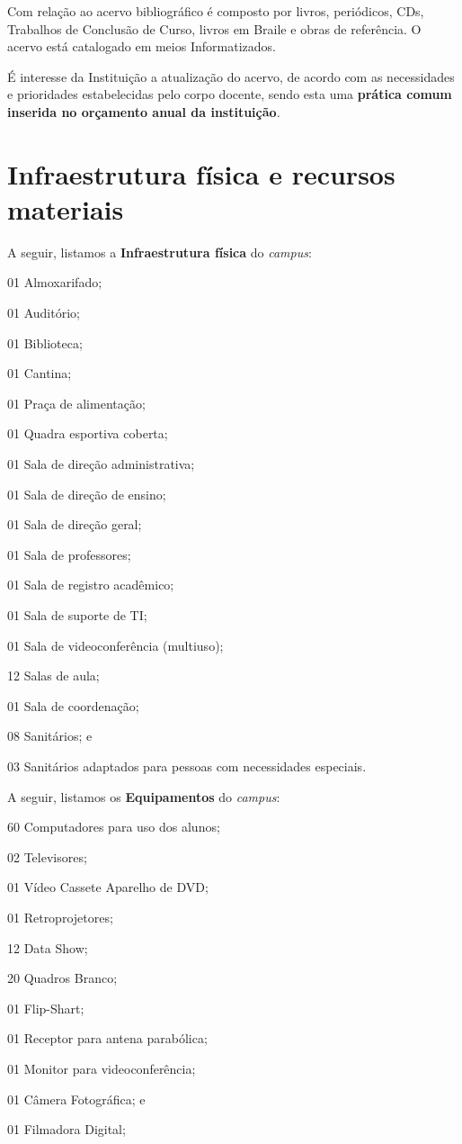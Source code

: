 \documentclass[
	12pt,				%
	openright,			%
	twoside,			%
	a4paper,			%
	chapter=TITLE,		%
	english,			%
	french,				%
	spanish,			%
	brazil,				%
	]{abntex2}
\begin{document}
Com relação ao acervo bibliográfico é composto por livros, periódicos, CDs, Trabalhos de Conclusão de Curso, livros em Braile e  obras de referência. O acervo está catalogado em meios Informatizados.

É interesse da Instituição a atualização do acervo, de acordo com as necessidades e prioridades estabelecidas pelo corpo docente, sendo esta uma \textbf{prática comum inserida no orçamento anual da instituição}.


\section{Infraestrutura física e recursos materiais}

A seguir, listamos a \textbf{Infraestrutura física} do \textit{campus}:

\begin{alineas}
	\item 01 Almoxarifado;
	\item 01 Auditório;
	\item 01 Biblioteca;
	\item 01 Cantina;
	\item 01  Praça de alimentação;
	\item 01 Quadra esportiva coberta;
	\item 01 Sala de direção administrativa;
	\item 01 Sala de direção de ensino;
	\item 01 Sala de direção geral;
	\item 01 Sala de professores;
	\item 01 Sala de registro acadêmico;
	\item 01 Sala de suporte de TI;
	\item 01 Sala de videoconferência (multiuso);
	\item 12 Salas de aula;
	\item 01 Sala de coordenação;
	\item 08 Sanitários; e
	\item 03 Sanitários adaptados para pessoas com necessidades especiais.	
\end{alineas}

A seguir, listamos os \textbf{Equipamentos} do \textit{campus}:

\begin{alineas}
	\item 60 Computadores para uso dos alunos;
	\item 02 Televisores;
	\item 01 Vídeo Cassete Aparelho de DVD;
	\item 01 Retroprojetores;
	\item 12 Data Show;
	\item 20 Quadros Branco;
	\item 01 Flip-Shart;
	\item 01 Receptor para antena parabólica;
	\item 01 Monitor para videoconferência;
	\item 01 Câmera Fotográfica; e
	\item 01 Filmadora Digital;
\end{alineas}
\end{document}
